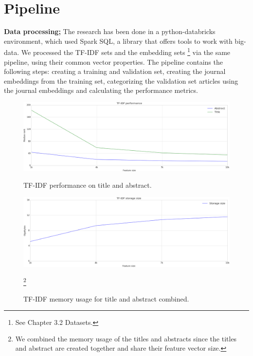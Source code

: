 \documentclass[../../paper.tex]{subfiles}
\begin{document}
\section{Pipeline}
\textbf{Data processing;} The research has been done in a python-databricks environment, which used Spark SQL, a library that offers tools to work with big-data. We processed the TF-IDF sets and the embedding sets \footnote{See Chapter 3.2 Datasets.} via the same pipeline, using their common vector properties. The pipeline contains the following steps: creating a training and validation set, creating the journal embeddings from the training set, categorizing the validation set articles using the journal embeddings and calculating the performance metrics.
\begin{figure}[hbt]
\includegraphics[width=5in]{Plots/tfidf_selection_plot_performance}
\caption{TF-IDF performance on title and abstract.}\label{figure:tfidfPerformance}
\includegraphics[width=5in]{Plots/tfidf_selection_plot_memory}
\caption{TF-IDF memory usage for title and abstract combined.}\footnote{We combined the memory usage of the titles and abstracts since the titles and abstract are created together and share their feature vector size.}\label{figure:tfidfMemory}
\end{figure}
\end{document}
